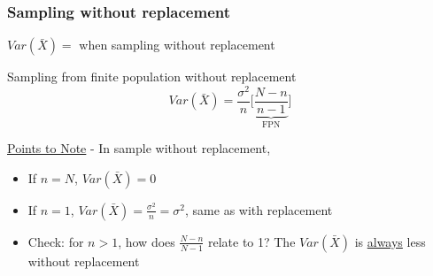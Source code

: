 \subsubsection*{Sampling without replacement}
$Var(\bar{X}) =$ when sampling without replacement\\
\begin{theorem}
	Sampling from finite population without replacement
	\begin{equation*}
		Var(\bar{X}) = \frac{\sigma^2}{n} \bigg[ \underbrace{\frac{N-n}{n-1} }_{\text{FPN}} \bigg] \tag{finite population correction}
	\end{equation*}
\end{theorem}
\underline{Points to Note} - In sample without replacement,
\begin{itemize}[label={--}]
	\item If $n = N$, $Var(\bar{X}) = 0$
	\item If $n=1$, $Var(\bar{X}) = \frac{\sigma^2}{n} = \sigma^2$, same as with replacement
	\item Check: for $n > 1$, how does $\frac{N-n}{N-1}$ relate to 1? The $Var(\bar{X})$ is \underline{always} less without replacement
\end{itemize}

